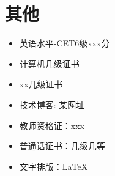\documentclass[11pt]{article}
\begin{document}
    \section{\makebox[\widthof{\faInfo}][c]{\color{NPU_Blue}{\faInfo}}\quad 其他}
    \begin{itemize}
        \item 英语水平-CET6级xxx分
        \item 计算机几级证书
        \item xx几级证书
        \item 技术博客: 某网址
        \item 教师资格证：xxx
        \item 普通话证书：几级几等
        \item 文字排版：\LaTeX
    \end{itemize}
\end{document}
